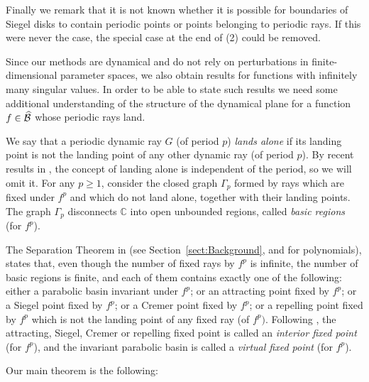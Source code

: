 \documentclass[11pt, twoside]{article}
\theoremstyle{definition}
\newcommand{\C}{\mathbb{C}}
\newcommand{\BB}{{\cal B}}
\newcommand{\BBhat}{\widehat{\BB}}
\begin{document}
Finally we remark that it is not known whether it is possible for boundaries of Siegel disks to contain periodic points or points belonging to  periodic  rays. If this were never the case, the special case at the end of (2) could be removed.


Since our methods are dynamical and do not rely on perturbations in finite-dimensional parameter spaces, we also obtain results for functions with infinitely many singular values. In order to be able to state such results we need some additional understanding of the structure of the dynamical plane for a function $f\in\BBhat$ whose periodic rays land. 

We say that a periodic dynamic ray $G$ (of period $p$)  {\em lands alone } if its landing point is not the landing point of any other dynamic ray (of period $p$). By recent results in \cite{BRG17}, the concept of landing alone is independent of the period, so we will omit it.   For any $p\geq 1$,  consider the closed  graph $\Gamma_p$ formed by rays which are fixed under  $f^p$ and which do not land alone, together with their landing points. The graph $\Gamma_p$ disconnects $\C$ into open unbounded regions, called \emph{basic regions} (for $f^p$).
 
The Separation Theorem in \cite{BF15} (see Section~\ref{sect:Background}, and \cite{GM} for polynomials), states that, even though the number of fixed rays by $f^p$ is infinite, the number of basic regions is finite, and each of them  contains exactly one of the following: either a parabolic basin   invariant under $f^p$; or an attracting  point fixed by $f^p$; or a Siegel   point fixed by $f^p$; or a Cremer   point fixed by $f^p$; or a repelling   point fixed by $f^p$ which is not the landing point of any fixed ray (of $f^p)$.    Following \cite{GM}, the attracting, Siegel, Cremer or repelling fixed point is called an \emph{interior fixed point} (for $f^p$),  and the invariant parabolic basin is called a \emph{virtual fixed point} (for $f^p$).

Our main theorem is the following:
\end{document}
